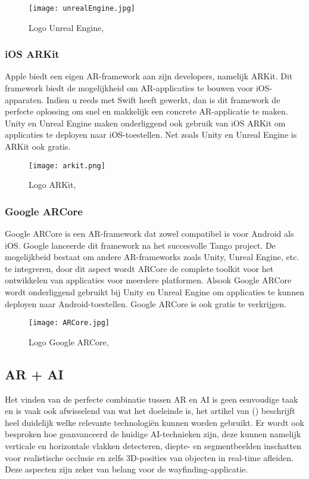 \begin{figure}[H]
	\centering
	\texttt{[image: unrealEngine.jpg]}
	\caption{Logo Unreal Engine, \autocite{UnrealEngine2019}}
\end{figure}

\subsubsection{iOS ARKit}
Apple biedt een eigen AR-framework aan zijn developers, namelijk ARKit. Dit framework biedt de mogelijkheid om AR-applicaties te bouwen voor iOS-apparaten. Indien u reeds met Swift heeft gewerkt, dan is dit framework de perfecte oplossing om snel en makkelijk een concrete AR-applicatie te maken. Unity en Unreal Engine maken onderliggend ook gebruik van iOS ARKit om applicaties te deployen naar iOS-toestellen. Net zoals Unity en Unreal Engine is ARKit ook gratis.
\begin{figure}[H]
	\centering
	\texttt{[image: arkit.png]}
	\caption{Logo ARKit, \autocite{Apple2019}}
\end{figure}

\subsubsection{Google ARCore}
Google ARCore is een AR-framework dat zowel compatibel is voor Android als iOS. Google lanceerde dit framework na het succesvolle Tango project.
De mogelijkbeid bestaat om andere AR-frameworks zoals Unity, Unreal Engine, etc.  te integreren, door dit aspect wordt ARCore de complete toolkit voor het ontwikkelen van applicaties voor meerdere platformen. Alsook Google ARCore wordt onderliggend gebruikt bij Unity en Unreal Engine om applicaties te kunnen deployen naar Android-toestellen. Google ARCore is ook gratis te verkrijgen.

\begin{figure}[H]
	\centering
	\texttt{[image: ARCore.jpg]}
	\caption{Logo Google ARCore, \autocite{ARCore2019}}
\end{figure}

\subsection{AR + AI}
Het vinden van de perfecte combinatie tussen AR en AI is geen eenvoudige taak en is vaak ook afwisselend van wat het doeleinde is, het artikel van \textcite{Toole2019} () beschrijft heel duidelijk welke relevante technologiën kunnen worden gebruikt. Er wordt ook besproken hoe geanvanceerd de huidige AI-technieken zijn, deze kunnen namelijk  verticale en horizontale vlakken detecteren, diepte- en segmentbeelden inschatten voor realistische occlusie en zelfs 3D-posities van objecten in real-time afleiden. Deze aspecten zijn zeker van belang voor de wayfinding-applicatie.

